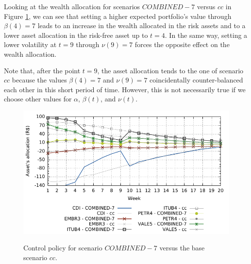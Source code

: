 Looking at the wealth allocation for scenarios $COMBINED-7$ versus $cc$ in Figure \ref{fig:u_spec1}, we can see that setting a higher expected portfolio's value through  $\beta(4)=7$ leads to an increase in the wealth allocated in the risk assets and to a lower asset allocation in the risk-free asset up to $t=4$.
In the same way, setting a lower volatility at $t=9$ through $\nu(9)=7$ forces the opposite effect on the wealth allocation.

Note that, after the point $t=9$, the asset allocation tends to the one of scenario $cc$ because the values $\beta(4)=7$ and $\nu(9)=7$ coincidentally counter-balanced each other in this short period of time. %
However, this is not necessarily true if we choose other values for $\alpha$, $\beta(t)$, and $\nu(t)$.
%
\begin{figure} [H]
	\caption{Control policy for scenario $COMBINED-7$ versus the base scenario $cc$.}
	\centering
	\includegraphics[width=6in,keepaspectratio]{figures/u_spec1}
	\label{fig:u_spec1}
\end{figure}


